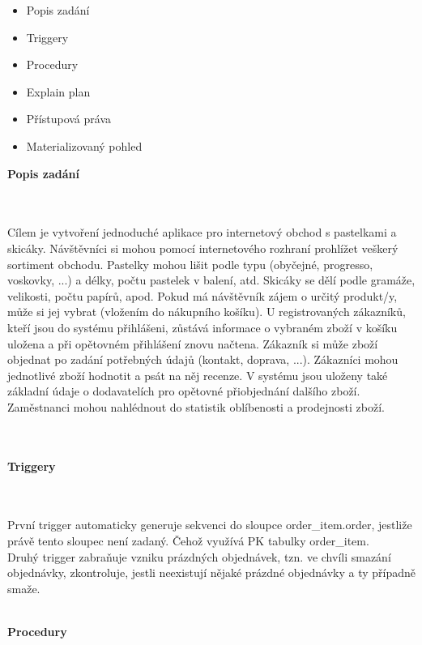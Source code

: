 \documentclass[12pt,a4paper]{article}
\begin{document}
	\begin{itemize}
	\item Popis zadání	
	\item Triggery
	\item Procedury
	\item Explain plan
	\item Přístupová práva
	\item Materializovaný pohled
	\end{itemize}
	
	

	\newpage
	\large
	
	\noindent \begin{Large} \textbf{{Popis zadání}} \end{Large}\\
	\\
	\indent Cílem je vytvoření jednoduché aplikace pro internetový obchod s pastelkami a skicáky. Návštěvníci si mohou pomocí internetového rozhraní prohlížet veškerý sortiment obchodu. Pastelky mohou lišit podle typu (obyčejné, progresso, voskovky, ...) a délky, počtu pastelek v balení, atd. Skicáky se dělí podle gramáže, velikosti, počtu papírů, apod. Pokud má návštěvník zájem o určitý produkt/y, může si jej vybrat (vložením do nákupního košíku). U registrovaných zákazníků, kteří jsou do systému přihlášeni, zůstává informace o vybraném zboží v košíku uložena a při opětovném přihlášení znovu načtena. Zákazník si může zboží objednat po zadání potřebných údajů (kontakt, doprava, ...). Zákazníci mohou jednotlivé zboží hodnotit a psát na něj recenze. V systému jsou uloženy také základní údaje o dodavatelích pro opětovné přiobjednání dalšího zboží. Zaměstnanci mohou nahlédnout do statistik oblíbenosti a prodejnosti zboží.  \\
	\\
	\\
	\noindent \begin{Large} \textbf{{Triggery}} \end{Large} \\
	\\
	První trigger automaticky generuje sekvenci do sloupce order\_item.order, jestliže právě tento sloupec není zadaný. Čehož využívá PK tabulky order\_item. \\
Druhý trigger zabraňuje vzniku prázdných objednávek, tzn. ve chvíli smazání objednávky, zkontroluje, jestli neexistují nějaké prázdné objednávky a ty případně smaže.
	\\
	\\
	\noindent \begin{Large} \textbf{{Procedury}} \end{Large} \\
\end{document}
